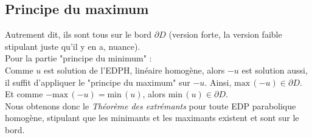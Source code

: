 \documentclass[british,french,11pt, a4paper, openany]{book}
\begin{document}
			\subsection{Principe du maximum}
			Autrement dit, ils sont tous sur le bord $\partial D$ (version forte, la version faible stipulant juste qu'il y en a, nuance).\\
			Pour la partie "principe du minimum" :\\
																	
			Comme $u$ est solution de l'EDPH, linéaire homogène, alors $-u$ est solution aussi, il suffit d'appliquer le "principe du maximum" sur $-u$. Ainsi, $\text{max}\,(-u)\in\partial D$. Et comme $-\text{max}\,(-u)=\text{min}\,(u)$, alors $\text{min}\,(u)\in\partial D$.\\
																	
			Nous obtenons donc le \textit{Théorème des extrémants} pour toute EDP parabolique homogène, stipulant que les minimants et les maximants existent et sont sur le bord.
																	
			\setcounter{subsection}{2}
\end{document}

